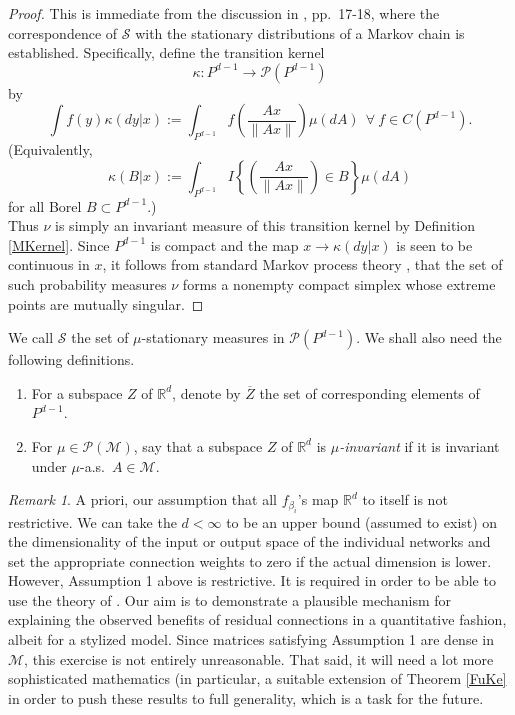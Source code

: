 \documentclass[12pt]{amsart}
\theoremstyle{plain}
\theoremstyle{definition}
\theoremstyle{remark}
\newtheorem{remark}[theorem]{Remark}
\newcommand{\R}{\mathbb{R}}
\newcommand{\M}{\mathcal{M}}
\newcommand{\PA}{\mathcal{P}}
\newcommand{\SA}{\mathcal{S}}
\newcommand{\0}{\textbf{0}}
\begin{document}
\begin{proof} This is immediate from the discussion in \cite{FK}, pp.\ 17-18, where the correspondence of $\SA$ with the stationary distributions of a Markov chain is established. Specifically, define the transition kernel 
$$\kappa : P^{d-1} \to \PA(P^{d-1})$$ 
by
$$\int f(y)\kappa(dy|x) := \int_{P^{d-1}}f\left(\frac{Ax}{\|Ax\|}\right)\mu(dA) \ \ \forall \ f \in C\left(P^{d-1}\right).$$
(Equivalently, $$\kappa(B|x) := \int_{P^{d-1}}I\left\{\left(\frac{Ax}{\|Ax\|}\right)\in B\right\}\mu(dA)$$
for all Borel $B \subset P^{d-1}$.) \\

Thus $\nu$ is simply an invariant measure of this transition kernel by Definition \ref{MKernel}. Since $P^{d-1}$ is compact and the map $x \to \kappa(dy|x)$ is  seen to be continuous in $x$, it follows from standard Markov process theory \cite{Benaim}, \cite{MeynTweedie} that the set of such probability measures $\nu$ forms a nonempty compact simplex whose extreme points are mutually singular. \end{proof}

\medskip

We call $\SA$ the set of $\mu$-stationary measures in $\PA(P^{d-1})$. We shall also need the following definitions.\\

\begin{enumerate}

\item For a subspace $Z$ of $\R^d$, denote by $\overline{Z}$ the set of corresponding elements of $P^{d-1}$.\\

\item For $\mu \in \PA(\M)$, say that a subspace $Z$ of $\R^d$ is  \textit{$\mu$-invariant} if it is invariant under $\mu$-a.s.\ $A \in \M$.
\end{enumerate}

\begin{remark}\label{DIM} A priori, our assumption that all $f_{\beta_i}$'s map $\R^d$ to itself is not restrictive. We can take the $d < \infty$ to be an upper bound (assumed to exist) on the dimensionality of the input or output space of the individual networks and set the appropriate connection weights to zero if the actual dimension is lower. However,  Assumption 1 above is  restrictive. It is required in order to be able to use the theory of \cite{FK}.  Our aim is to demonstrate a plausible mechanism for explaining the observed benefits of residual connections in a quantitative fashion, albeit for a stylized model. Since matrices satisfying Assumption 1 are dense in $\M$, this exercise is not entirely unreasonable. That said, it will need a lot more sophisticated mathematics (in particular, a suitable extension of Theorem \ref{FuKe} in order to push these results to full generality, which is a task for the future. \end{remark}
\end{document}
